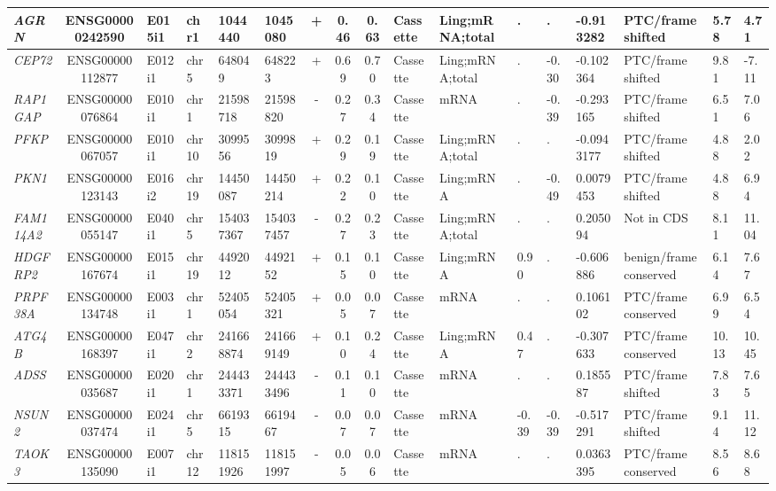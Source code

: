 \begin{appendices}
\begin{landscape}
\begin{table}
{\begin{tabular}{|l|c|l|l|l|l|c|c|c|l|l|l|l|l|l|l|l|}
		\textit{AGRN} & ENSG00000242590 & E015i1 & chr1  & 1044440 & 1045080 & +     & 0.46  & 0.63  & Cassette & Ling;mRNA;total & . & . & -0.913282 & PTC/frame shifted & 5.78  &  4.71 \\ \hline
\textit{CEP72} & ENSG00000112877 & E012i1 & chr5  & 648049 & 648223 & +     & 0.69  & 0.70  & Cassette & Ling;mRNA;total & . & -0.30 & -0.102364 & PTC/frame shifted & 9.81  &  -7.11 \\ \hline
\textit{RAP1GAP} & ENSG00000076864 & E010i1 & chr1  & 21598718 & 21598820 & -     & 0.27  & 0.34  & Cassette & mRNA  & . & -0.39 & -0.293165 & PTC/frame shifted & 6.51  &  7.06 \\ \hline
\textit{PFKP} & ENSG00000067057 & E010i1 & chr10 & 3099556 & 3099819 & +     & 0.29  & 0.19  & Cassette & Ling;mRNA;total & . & . & -0.0943177 & PTC/frame shifted & 4.88  &  2.02 \\ \hline
\textit{PKN1} & ENSG00000123143 & E016i2 & chr19 & 14450087 & 14450214 & +     & 0.22  & 0.10  & Cassette & Ling;mRNA & . & -0.49 & 0.0079453 & PTC/frame shifted & 4.88  &  6.94 \\ \hline
\textit{FAM114A2} & ENSG00000055147 & E040i1 & chr5  & 154037367 & 154037457 & -     & 0.27  & 0.23  & Cassette & Ling;mRNA;total & . & . & 0.205094 & Not in CDS & 8.11  &  11.04 \\ \hline
\textit{HDGFRP2} & ENSG00000167674 & E015i1 & chr19 & 4492012 & 4492152 & +     & 0.15  & 0.10  & Cassette & Ling;mRNA & 0.90  & . & -0.606886 & benign/frame conserved & 6.14  &  7.67 \\ \hline
\textit{PRPF38A} & ENSG00000134748 & E003i1 & chr1  & 52405054 & 52405321 & +     & 0.05  & 0.07  & Cassette & mRNA  & . & . & 0.106102 & PTC/frame conserved & 6.99  &  6.54 \\ \hline
\textit{ATG4B} & ENSG00000168397 & E047i1 & chr2  & 241668874 & 241669149 & +     & 0.10  & 0.24  & Cassette & Ling;mRNA & 0.47  & . & -0.307633 & PTC/frame conserved & 10.13 &  10.45 \\ \hline
\textit{ADSS} & ENSG00000035687 & E020i1 & chr1  & 244433371 & 244433496 & -     & 0.11  & 0.10  & Cassette & mRNA  & . & . & 0.185587 & PTC/frame shifted & 7.83  &  7.65 \\ \hline
\textit{NSUN2} & ENSG00000037474 & E024i1 & chr5  & 6619315 & 6619467 & -     & 0.07  & 0.07  & Cassette & mRNA  & -0.39 & -0.39 & -0.517291 & PTC/frame shifted & 9.14  &  11.12 \\ \hline		
		\textit{TAOK3} & ENSG00000135090 & E007i1 & chr12 & 118151926 & 118151997 & -     & 0.05  & 0.06  & Cassette & mRNA  & . & . & 0.0363395 & PTC/frame conserved & 8.56  &  8.68 \\ \hline

\end{tabular}}
\end{table}
\end{landscape}
\end{appendices}
